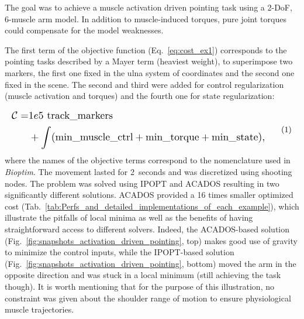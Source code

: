 The goal was to achieve a muscle activation driven pointing task using a 2-DoF, 6-muscle arm model. 
In addition to muscle-induced torques, pure joint torques could compensate for the model weaknesses.

The first term of the objective function (Eq.~\ref{eq:cost_ex1}) corresponds to the pointing tasks described by a Mayer term (heaviest weight), to superimpose two markers, the first one fixed in the ulna system of coordinates and the second one fixed in the scene.
The second and third were added for control regularization (muscle activation and torques) and the fourth one for state regularization:

%
%
\[
\resizebox{0.9\columnwidth}{!}{$
\begin{aligned}
	\mathcal{C} = &1e5~\text{track\_markers}\\
	&+ \int (\text{min\_muscle\_ctrl}+\text{min\_torque}+\text{min\_state}),
\end{aligned}
$}
\addtag
\label{eq:cost_ex1}
\]
%
\noindent where the names of the objective terms correspond to the nomenclature used in \textit{Bioptim}.
The movement lasted for 2~seconds and was discretized using  shooting nodes.
The problem was solved using IPOPT and ACADOS resulting in two significantly different solutions.
ACADOS provided a 16 times smaller optimized cost (Tab.~\ref{tab:Perfs_and_detailed_implementations_of_each_example}), which illustrate the pitfalls of local minima as well as the benefits of having straightforward access to different solvers.  
Indeed, the ACADOS-based solution (Fig.~\ref{fig:snapshots_activation_driven_pointing}, top) makes good use of gravity to minimize the control inputs, while the IPOPT-based solution (Fig.~\ref{fig:snapshots_activation_driven_pointing}, bottom) moved the arm in the opposite direction and was stuck in a local minimum (still achieving the task though). 
It is worth mentioning that for the purpose of this illustration, no constraint was given about the shoulder range of motion to ensure physiological muscle trajectories. 

